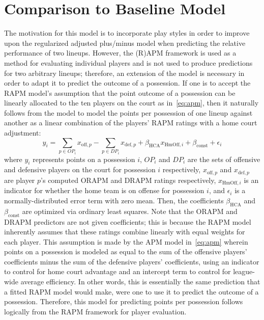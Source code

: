 \section{Comparison to Baseline Model}
\label{sec:baseline}

The motivation for this model is to incorporate play styles in order to improve upon
the regularized adjusted plus/minus model when predicting the relative performance
of two lineups. However, the (R)APM framework is used as a method for evaluating
individual players and is not used to produce predictions for two arbitrary lineups;
therefore, an extension of the model is necessary in order to adapt it to
predict the outcome of a possession. If one is to accept the RAPM model's assumption
that the point outcome of a possession can be linearly allocated to the ten players
on the court as in~\eqref{eq:apm}, then it naturally follows from the model to model
the points per possession of one lineup against another as a linear combination of
the players' RAPM ratings with a home court adjustment:
\begin{equation} \label{eqn:baseline}
    y_i = \sum_{p \in OP_i} x_{\text{off}, p} - \sum_{p \in DP_i} x_{\text{def}, p}
    + \beta_{\text{HCA}}x_{\text{HmOff},i} + \beta_{\text{const}} + \epsilon_i
\end{equation}
where $y_i$ represents points on a possession $i$, $OP_i$ and $DP_i$ are the sets of
offensive and defensive players on the court for possession $i$ respectively,
$x_{\text{off}, p}$ and $x_{\text{def}, p}$ are player $p$'s computed ORAPM and
DRAPM ratings respectively, $x_{\text{HmOff}, i}$ is an indicator for whether the
home team is on offense for possession $i$, and $\epsilon_i$ is a
normally-distributed error term with zero mean. Then, the coefficients
$\beta_{\text{HCA}}$ and $\beta_{\text{const}}$ are optimized via ordinary least
squares. Note that the ORAPM and DRAPM predictors are not given coefficients; this
is because the RAPM model inherently assumes that these ratings combine linearly
with equal weights for each player. This assumption is made by the APM model
in~\eqref{eq:apm} wherein points on a possession is modeled as equal to the sum of
the offensive players' coefficients minus the sum of the defensive players'
coefficients, using an indicator to control for home court advantage and an
intercept term to control for league-wide average efficiency. In other words, this
is essentially the same prediction that a fitted RAPM model would make, were one to
use it to predict the outcome of a possession. Therefore, this model for predicting
points per possession follows logically from the RAPM framework for player
evaluation.

